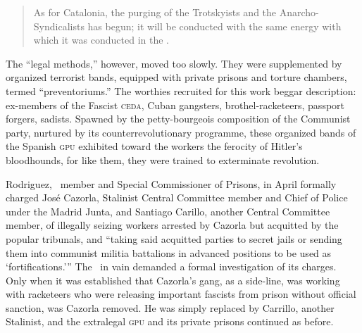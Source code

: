 \begin{quotation}
  As for Catalonia, the purging of the Trotskyists and the Anarcho-Syndicalists has begun; it will be conducted with the same energy with which it was conducted in the \USSR.
\end{quotation}
The ``legal methods,'' however, moved too slowly. They were supplemented by organized terrorist bands, equipped with private prisons and torture chambers, termed ``preventoriums.'' The worthies recruited for this work beggar description: ex-members of the Fascist \textsc{ceda}, Cuban gangsters, brothel-racketeers, passport forgers, sadists. Spawned by the petty-bourgeois composition of the Communist party, nurtured by its counterrevolutionary programme, these organized bands of the Spanish \textsc{gpu} exhibited toward the workers the ferocity of Hitler’s bloodhounds, for like them, they were trained to exterminate revolution.

Rodriguez, \CNT\ member and Special Commissioner of Prisons, in April formally charged José Cazorla, Stalinist Central Committee member and Chief of Police under the Madrid Junta, and Santiago Carillo, another Central Committee member, of illegally seizing workers arrested by Cazorla but acquitted by the popular tribunals, and ``taking said acquitted parties to secret jails or sending them into communist militia battalions in advanced positions to be used as `fortifications.''' The \CNT\ in vain demanded a formal investigation of its charges. Only when it was established that Cazorla’s gang, as a side-line, was working with racketeers who were releasing important fascists from prison without official sanction, was Cazorla removed. He was simply replaced by Carrillo, another Stalinist, and the extralegal \textsc{gpu} and its private prisons continued as before.

